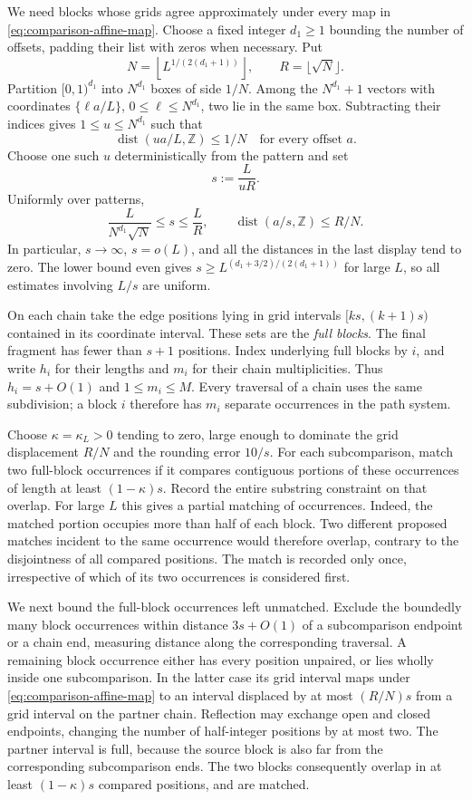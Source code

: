 We need blocks whose grids agree approximately under every map in
\eqref{eq:comparison-affine-map}.  Choose a fixed integer $d_1\geq1$
bounding the number of offsets, padding their list with zeros when
necessary.  Put
\[
 N=\left\lfloor L^{1/(2(d_1+1))}\right\rfloor,
 \qquad R=\lfloor\sqrt N\rfloor.
\]
Partition $[0,1)^{d_1}$ into $N^{d_1}$ boxes of side $1/N$.  Among
the $N^{d_1}+1$ vectors with coordinates $\{\ell a/L\}$,
$0\leq\ell\leq N^{d_1}$, two lie in the same box.  Subtracting their
indices gives $1\leq u\leq N^{d_1}$ such that
\[
 \operatorname{dist}(ua/L,\mathbb Z)\leq1/N
 \quad\text{for every offset }a.
\]
Choose one such $u$ deterministically from the pattern and set
\begin{equation}\label{eq:block-scale}
 s:=\frac{L}{uR}.
\end{equation}
Uniformly over patterns,
\[
 \frac{L}{N^{d_1}\sqrt N}\leq s\leq\frac LR,
 \qquad
 \operatorname{dist}(a/s,\mathbb Z)\leq R/N.
\]
In particular, $s\to\infty$, $s=o(L)$, and all the distances in the
last display tend to zero.  The lower bound even gives
$s\geq L^{(d_1+3/2)/(2(d_1+1))}$ for large $L$, so all estimates
involving $L/s$ are uniform.

On each chain take the edge positions lying in grid intervals
$[ks,(k+1)s)$ contained in its coordinate interval.  These sets are
the \emph{full blocks}.  The final fragment has fewer than $s+1$
positions.  Index underlying full blocks by $i$, and write $h_i$ for
their lengths and $m_i$ for their chain multiplicities.  Thus
$h_i=s+O(1)$ and $1\leq m_i\leq M$.  Every traversal of a chain uses
the same subdivision; a block $i$ therefore has $m_i$ separate
occurrences in the path system.

Choose $\kappa=\kappa_L>0$ tending to zero, large enough to dominate
the grid displacement $R/N$ and the rounding error $10/s$.  For each
subcomparison, match two full-block occurrences if it compares
contiguous portions of these occurrences of length at least
$(1-\kappa)s$.  Record the entire substring constraint on that overlap.
For large $L$ this gives a partial matching of occurrences.  Indeed,
the matched portion occupies more than half of each block.  Two
different proposed matches incident to the same occurrence would
therefore overlap, contrary to the disjointness of all compared
positions.  The match is recorded only once, irrespective of which of
its two occurrences is considered first.

We next bound the full-block occurrences left unmatched.
Exclude the boundedly many block occurrences
within distance $3s+O(1)$ of a subcomparison endpoint or a chain end,
measuring distance along the corresponding traversal.  A remaining
block occurrence either has every position unpaired, or lies wholly
inside one subcomparison.  In the latter case its grid interval maps
under \eqref{eq:comparison-affine-map} to an interval displaced by
at most $(R/N)s$ from a grid interval on the partner chain.  Reflection
may exchange open and closed endpoints, changing the number of
half-integer positions by at most two.  The partner interval is full,
because the source block is also far from the corresponding
subcomparison ends.  The two blocks consequently overlap in at least
$(1-\kappa)s$ compared positions, and are matched.


